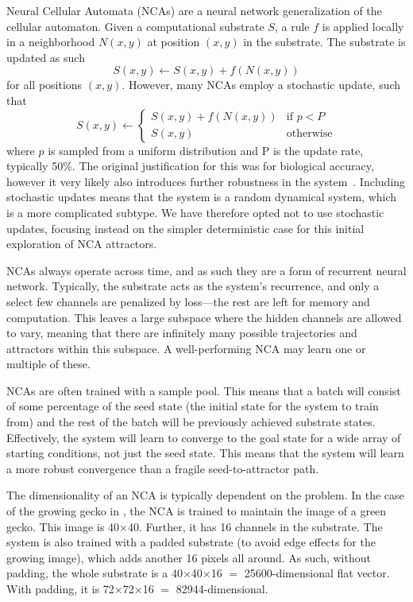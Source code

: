 \documentclass[letterpaper]{article}
\begin{document}
Neural Cellular Automata (NCAs) are a neural network generalization of the cellular automaton. Given a computational substrate $S$, a rule $f$ is applied locally in a neighborhood $N(x,y)$ at position $(x,y)$ in the substrate. The substrate is updated as such
\begin{equation}
    S(x,y) \leftarrow S(x,y) + f(N(x,y)) 
\end{equation}
for all positions $(x,y)$. However, many NCAs employ a stochastic update, such that 
\begin{equation}
    S(x,y) \leftarrow \begin{cases} 
      S(x,y) + f(N(x,y)) & \text{if } p < P \\
      S(x,y) & \text{otherwise} 
   \end{cases}
\end{equation}
where $p$ is sampled from a uniform distribution and P is the update rate, typically 50\%. The original justification for this was for biological accuracy, however it very likely also introduces further robustness in the system~\citep{niklasson_asynchronicityneuralcellular}. Including stochastic updates means that the system is a random dynamical system, which is a more complicated subtype. We have therefore opted not to use stochastic updates, focusing instead on the simpler deterministic case for this initial exploration of NCA attractors. 

NCAs always operate across time, and as such they are a form of recurrent neural network. Typically, the substrate acts as the system's recurrence, and only a select few channels are penalized by loss---the rest are left for memory and computation. This leaves a large subspace where the hidden channels are allowed to vary, meaning that there are infinitely many possible trajectories and attractors within this subspace. A well-performing NCA may learn one or multiple of these. 

NCAs are often trained with a sample pool. This means that a batch will consist of some percentage of the seed state (the initial state for the system to train from) and the rest of the batch will be previously achieved substrate states. Effectively, the system will learn to converge to the goal state for a wide array of starting conditions, not just the seed state. This means that the system will learn a more robust convergence than a fragile seed-to-attractor path.  

The dimensionality of an NCA is typically dependent on the problem. In the case of the growing gecko in \citep{mordvintsev2020growing}, the NCA is trained to maintain the image of a green gecko. This image is 40$\times$40. Further, it has 16 channels in the substrate. The system is also trained with a padded substrate (to avoid edge effects for the growing image), which adds another 16 pixels all around. As such, without padding, the whole substrate is a 40$\times$40$\times$16 $=$ 25600-dimensional flat vector. With padding, it is 72$\times$72$\times$16 $=$ 82944-dimensional.
\end{document}
